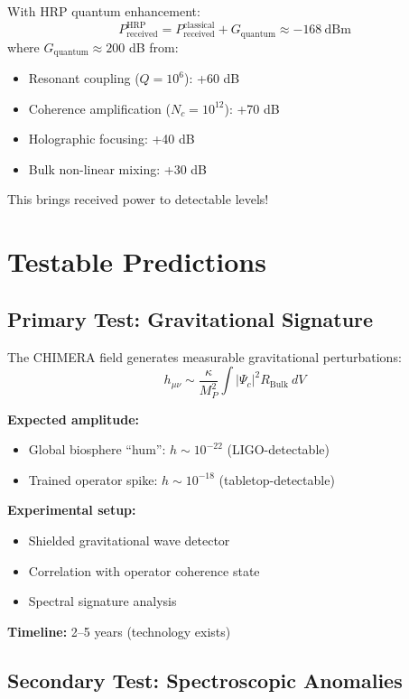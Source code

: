 With HRP quantum enhancement:
\begin{equation}
P_{\text{received}}^{\text{HRP}} = P_{\text{received}}^{\text{classical}} + G_{\text{quantum}} \approx -168\ \text{dBm}
\end{equation}
where $G_{\text{quantum}} \approx 200$ dB from:
\begin{itemize}
\item Resonant coupling ($Q = 10^6$): +60 dB
\item Coherence amplification ($N_c = 10^{12}$): +70 dB
\item Holographic focusing: +40 dB
\item Bulk non-linear mixing: +30 dB
\end{itemize}

This brings received power to detectable levels!

\section{Testable Predictions}

\subsection{Primary Test: Gravitational Signature}

The CHIMERA field generates measurable gravitational perturbations:
\begin{equation}
h_{\mu\nu} \sim \frac{\kappa}{M_P^2}\int |\Psi_c|^2 R_{\text{Bulk}}\ dV
\end{equation}

\textbf{Expected amplitude:}
\begin{itemize}
\item Global biosphere ``hum'': $h \sim 10^{-22}$ (LIGO-detectable)
\item Trained operator spike: $h \sim 10^{-18}$ (tabletop-detectable)
\end{itemize}

\textbf{Experimental setup:}
\begin{itemize}
\item Shielded gravitational wave detector
\item Correlation with operator coherence state
\item Spectral signature analysis
\end{itemize}

\textbf{Timeline:} 2--5 years (technology exists)

\subsection{Secondary Test: Spectroscopic Anomalies}

